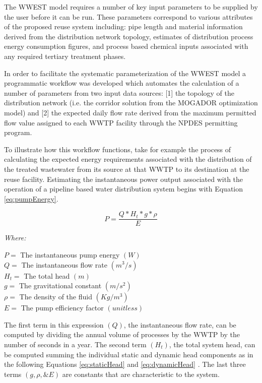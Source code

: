 The WWEST model requires a number of key input parameters to be supplied by the user before it can be run. These parameters correspond to various attributes of the proposed reuse system including: pipe length and material information derived from the distribution network topology, estimates of distribution process energy consumption figures, and process based chemical inputs associated with any required tertiary treatment phases.

In order to facilitate the systematic parameterization of the WWEST model a programmatic workflow was developed which automates the calculation of a number of parameters from two input data sources: [1] the topology of the distribution network (i.e. the corridor solution from the MOGADOR optimization model) and [2] the expected daily flow rate derived from the maximum permitted flow value assigned to each WWTP facility through the NPDES permitting program. 

To illustrate how this workflow functions, take for example the process of calculating the expected energy requirements associated with the distribution of the treated wastewater from its source at that WWTP to its destination at the reuse facility. Estimating the instantaneous power output associated with the operation of a pipeline based water distribution system begins with Equation \ref{eq:pumpEnergy}\cite{Liu2003}.

      \begin{equation}
          P = \frac{Q * H_t * g * \rho}{E}
          \label{eq:pumpEnergy}
      \end{equation}
      
       \noindent \textit{Where:} \hfill

       \begin{center}
           $P = $ The instantaneous pump energy $(W)$ \\
           $Q = $ The instantaneous flow rate $(m^{3}/s)$\\
           $H_{t} = $ The total head $(m)$ \\
           $g = $ The gravitational constant $(m/s^{2})$ \\
           $\rho = $ The density of the fluid $(Kg/m^3)$ \\
           $E = $ The pump efficiency factor $(unitless)$ \\
       \end{center}

The first term in this expression $(Q)$, the instantaneous flow rate, can be computed by dividing the annual volume of processes by the WWTP by the number of seconds in a year. The second term $(H_t)$, the total system head, can be computed summing the individual static and dynamic head components as in the following Equations \ref{eq:staticHead} and \ref{eq:dynamicHead} \cite{Liu2003}. The last three terms $(g,\rho, \& E)$ are constants that are characteristic to the system.

